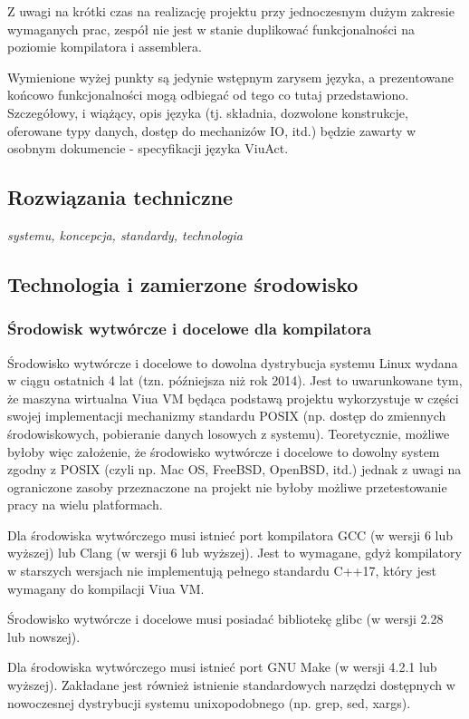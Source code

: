 \documentclass[11pt,oneside,a4paper,titlepage,onecolumn]{article}
\begin{document}
Z uwagi na krótki czas na realizację projektu przy jednoczesnym dużym zakresie wymaganych prac, zespół nie
jest w stanie duplikować funkcjonalności na poziomie kompilatora i assemblera.

Wymienione wyżej punkty są jedynie wstępnym zarysem języka, a prezentowane końcowo funkcjonalności mogą
odbiegać od tego co tutaj przedstawiono. Szczegółowy, i wiążący, opis języka (tj. składnia, dozwolone
konstrukcje, oferowane typy danych, dostęp do mechanizów IO, itd.) będzie zawarty w osobnym dokumencie -
specyfikacji języka ViuAct.

\subsection{Rozwiązania techniczne}

\emph{systemu, koncepcja, standardy, technologia}

\subsection{Technologia i zamierzone środowisko}

\subsubsection{Środowisk wytwórcze i docelowe dla kompilatora}

Środowisko wytwórcze i docelowe to dowolna dystrybucja systemu Linux wydana w ciągu ostatnich 4 lat (tzn.
późniejsza niż rok 2014). Jest to uwarunkowane tym, że maszyna wirtualna Viua VM będąca podstawą projektu
wykorzystuje w części swojej implementacji mechanizmy standardu POSIX (np. dostęp do zmiennych środowiskowych,
pobieranie danych losowych z systemu). Teoretycznie, możliwe byłoby więc założenie, że środowisko wytwórcze i
docelowe to dowolny system zgodny z POSIX (czyli np. Mac OS, FreeBSD, OpenBSD, itd.) jednak z uwagi na
ograniczone zasoby przeznaczone na projekt nie byłoby możliwe przetestowanie pracy na wielu platformach.

Dla środowiska wytwórczego musi istnieć port kompilatora GCC (w wersji 6 lub wyższej) lub Clang (w wersji 6
lub wyższej). Jest to wymagane, gdyż kompilatory w starszych wersjach nie implementują pełnego standardu
C++17, który jest wymagany do kompilacji Viua VM.

Środowisko wytwórcze i docelowe musi posiadać bibliotekę glibc (w wersji 2.28 lub nowszej).

Dla środowiska wytwórczego musi istnieć port GNU Make (w wersji 4.2.1 lub wyższej). Zakładane jest również
istnienie standardowych narzędzi dostępnych w nowoczesnej dystrybucji systemu unixopodobnego (np. grep, sed,
xargs).
\end{document}
